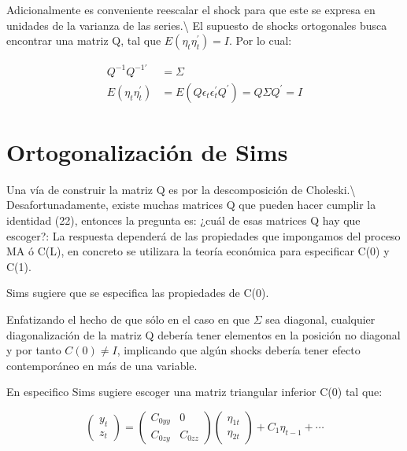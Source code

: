 \documentclass[
]{book}
\begin{document}
Adicionalmente es conveniente reescalar el shock para que este se expresa en unidades de la varianza de las series.\textbackslash{}
El supuesto de shocks ortogonales busca encontrar una matriz Q, tal que \(E(\eta_{t}\eta_{t}^{'})=I\). Por lo cual:

\begin{align}
Q^{-1}Q^{-1'}&=\Sigma \\
E(\eta_{t}\eta_{t}^{'})&=E(Q\epsilon_{t}\epsilon_{t}^{'}Q^{'})=Q\Sigma Q^{'}=I\nonumber
\end{align}

\hypertarget{ortogonalizaciuxf3n-de-sims}{%
\section{Ortogonalización de Sims}\label{ortogonalizaciuxf3n-de-sims}}

Una vía de construir la matriz Q es por la descomposición de Choleski.\textbackslash{}
Desafortunadamente, existe muchas matrices Q que pueden hacer cumplir la identidad (22), entonces la pregunta es: ¿cuál de esas matrices Q hay que escoger?: La respuesta dependerá de las propiedades que impongamos del proceso MA ó C(L), en concreto se utilizara la teoría económica para especificar C(0) y C(1).

Sims sugiere que se especifica las propiedades de C(0).

Enfatizando el hecho de que sólo en el caso en que \(\Sigma\) sea diagonal, cualquier diagonalización de la matriz Q debería tener elementos en la posición no diagonal y por tanto \(C(0)\neq I\), implicando que algún shocks debería tener efecto contemporáneo en más de una variable.

En especifico Sims sugiere escoger una matriz triangular inferior C(0) tal que:

\begin{equation}
    \left( \begin{array}{c}
    y_{t} \\
    z_{t} 
    \end{array}\right)=\left( \begin{array}{cc}
    C_{0yy} & 0\\
    C_{0zy} & C_{0zz}
    \end{array}
    \right) \left( \begin{array}{c}
    \eta_{1t}\\
    \eta_{2t}
    \end{array}
    \right) +C_{1}\eta_{t-1}+\cdots
\end{equation}
\end{document}
